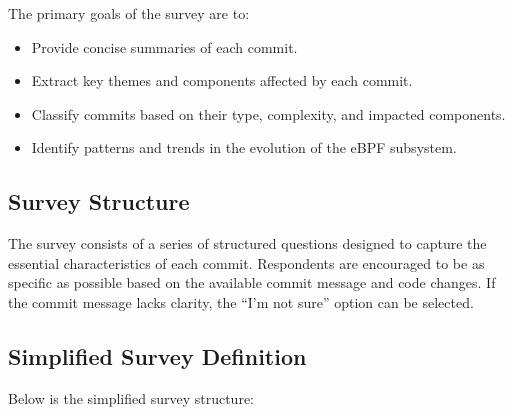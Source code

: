\documentclass[sigconf,review,anonymous]{acmart}
\begin{document}
The primary goals of the survey are to:

\begin{itemize}
    \item Provide concise summaries of each commit.
    \item Extract key themes and components affected by each commit.
    \item Classify commits based on their type, complexity, and impacted components.
    \item Identify patterns and trends in the evolution of the eBPF subsystem.
\end{itemize}

\subsection{Survey Structure}

The survey consists of a series of structured questions designed to capture the essential characteristics of each commit. Respondents are encouraged to be as specific as possible based on the available commit message and code changes. If the commit message lacks clarity, the ``I'm not sure'' option can be selected.

\subsection{Simplified Survey Definition}

Below is the simplified survey structure:
\end{document}
